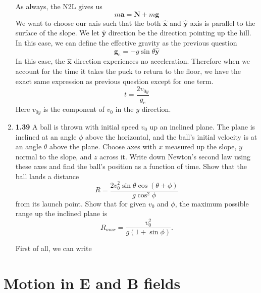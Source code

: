 \documentclass[12pt]{article}
\newcommand{\unx}{\hat{\mathbf{x}}}
\newcommand{\uny}{\hat{\mathbf{y}}}
\begin{document}
\begin{enumerate}
As always, the N2L gives us
\[
m\mathbf{a} = \mathbf{N}+ m\mathbf{g}
\]
We want to choose our axis such that the both $\unx$ and $\uny$ axis is parallel to the surface of the slope. We let $\uny$ direction be the direction pointing up the hill. In this case, we can define the effective gravity as the previous question
\[
\mathbf{g}_e = -g\sin\theta\uny
\]
In this case, the $\unx$ direction experiences no acceleration. Therefore when we account for the time it takes the puck to return to the floor, we have the exact same expression as previous question except for one term.
\[
t = \frac{2v_{0y}}{g_e}
\]
Here $v_{0y}$ is the component of $v_0$ in the $y$ direction.



\item \textbf{1.39} A ball is thrown with initial speed \( v_0 \) up an inclined plane. The plane is inclined at an angle \( \phi \) above the horizontal, and the ball’s initial velocity is at an angle \( \theta \) above the plane. Choose axes with \( x \) measured up the slope, \( y \) normal to the slope, and \( z \) across it. Write down Newton’s second law using these axes and find the ball’s position as a function of time. Show that the ball lands a distance 
\[
R = \frac{2v_0^2 \sin \theta \cos(\theta + \phi)}{g \cos^2 \phi}
\]
from its launch point. Show that for given \( v_0 \) and \( \phi \), the maximum possible range up the inclined plane is
\[
R_{max} = \frac{v_0^2}{g(1 + \sin \phi)}.
\]

First of all, we can write 


\end{enumerate}

\section{Motion in \(\mathbf{E}\) and \(\mathbf{B}\) fields}
\end{document}

